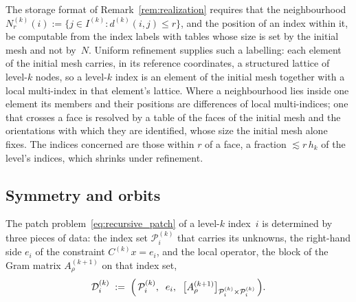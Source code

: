\documentclass[hidelinks]{siamart}
\theoremstyle{nonumberplain}
\numberwithin{theorem}{section}
\begin{document}
The storage format of Remark~\ref{rem:realization} requires that the
neighbourhood
$N^{(k)}_r(i) := \{ j \in I^{(k)} : d^{(k)}(i,j) \leq r \}$, and the
position of an index within it, be computable from the index labels
with tables whose size is set by the initial mesh and not by~$N$.
Uniform refinement supplies such a labelling: each element of the
initial mesh carries, in its reference coordinates, a structured
lattice of level-$k$ nodes, so a level-$k$ index is an element of the
initial mesh together with a local multi-index in that element's
lattice.  Where a neighbourhood lies inside one element its members and
their positions are differences of local multi-indices; one that
crosses a face is resolved by a table of the faces of the initial mesh
and the orientations with which they are identified, whose size the
initial mesh alone fixes.  The indices concerned are those within $r$ of
a face, a fraction $\lesssim r\, h_k$ of the level's indices, which
shrinks under refinement.

\subsection{Symmetry and orbits}
\label{sec:symmetry}
The patch problem~\eqref{eq:recursive_patch} of a level-$k$ index~$i$ is
determined by three pieces of data: the index set
$\mathcal{P}^{(k)}_i$ that carries its unknowns, the right-hand side
$e_i$ of the constraint $C^{(k)} x = e_i$, and the local operator, the
block of the Gram matrix $A^{(k+1)}_\rho$ on that index set,
\begin{equation}\label{eq:patch_data}
  \mathcal{D}^{(k)}_i \;:=\;
  \Bigl(\, \mathcal{P}^{(k)}_i, \;\; e_i, \;\;
    \bigl[A^{(k+1)}_\rho\bigr]_{\mathcal{P}^{(k)}_i \times \mathcal{P}^{(k)}_i}
  \,\Bigr).
\end{equation}
\end{document}
